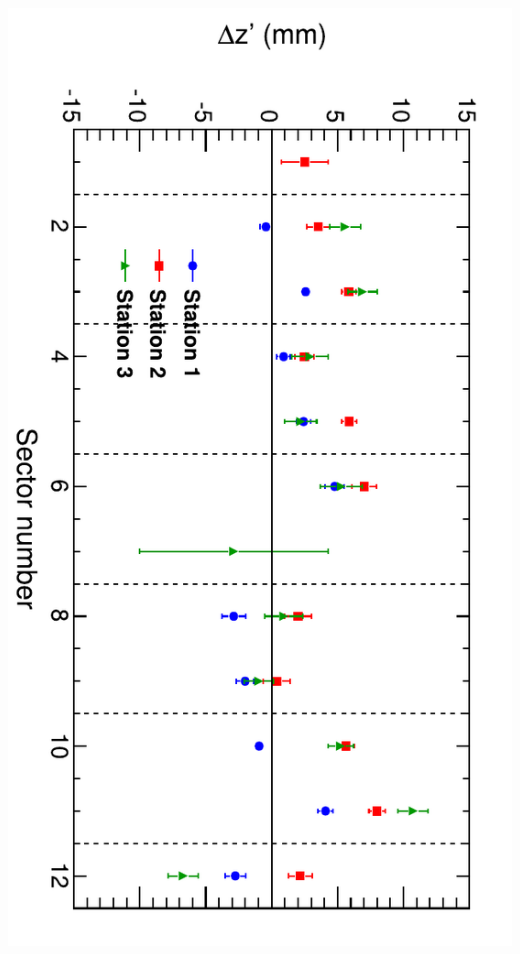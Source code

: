\documentclass[compress]{beamer}
\begin{document}
\begin{frame}
\includegraphics[height=\linewidth, angle=90]{zfits_stations.pdf}
\end{frame}
\end{document}

